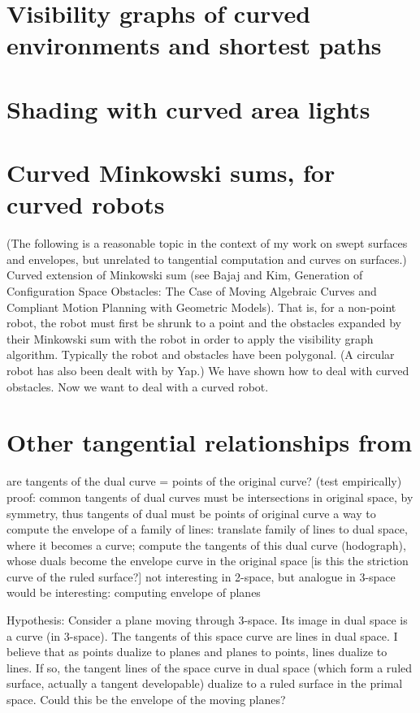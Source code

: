 \section{Visibility graphs of curved environments and shortest paths}

\section{Shading with curved area lights}

\section{Curved Minkowski sums, for curved robots}

(The following is a reasonable topic in the context of my work on 
swept surfaces and envelopes, but unrelated to tangential computation
and curves on surfaces.)
Curved extension of Minkowski sum (see Bajaj and Kim, Generation of Configuration
Space Obstacles: The Case of Moving Algebraic Curves
and Compliant Motion Planning with Geometric Models).
That is, for a non-point robot, the robot must first be shrunk to a point
and the obstacles expanded by their Minkowski sum with the robot
in order to apply the visibility graph algorithm.
Typically the robot and obstacles have been polygonal.
(A circular robot has also been dealt with by Yap.)
We have shown how to deal with curved obstacles.
Now we want to deal with a curved robot.

\section{Other tangential relationships from \tangs}

are tangents of the dual curve = points of the original curve? (test empirically)
proof: common tangents of dual curves must be intersections in original space, 
	by symmetry, thus tangents of dual must be points of original curve
a way to compute the envelope of a family of lines:
	translate family of lines to dual space, where it becomes a curve;
	compute the tangents of this dual curve (hodograph), 
	whose duals become the envelope curve in the original space
	[is this the striction curve of the ruled surface?]
	not interesting in 2-space, but analogue in 3-space would be interesting:
	computing envelope of planes
	
Hypothesis: Consider a plane moving through 3-space.
	Its image in dual space is a curve (in 3-space).
	The tangents of this space curve are lines in dual space.
	I believe that as points dualize to planes and planes to points,
	lines dualize to lines.
	If so, the tangent lines of the space curve in dual space
	(which form a ruled surface, actually a tangent developable)
	dualize to a ruled surface in the primal space.
	Could this be the envelope of the moving planes?

